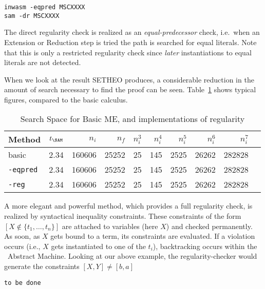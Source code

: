 \begin{center}
\begin{verbatim}
inwasm -eqpred MSCXXXX
sam -dr MSCXXXX
\end{verbatim}
\end{center}

The direct regularity check is realized as an {\em
equal-predecessor\/} check, i.e.\ when an Extension or Reduction step
is tried the path is searched for equal literals. Note that this is
only a restricted regularity check since {\em later\/} instantiations
to equal literals are not detected. 

When we look at the result SETHEO produces, a considerable 
reduction in the amount of search necessary to find the proof
can be seen.
Table~\ref{tab:tut2:results.regularity} shows typical figures, compared
to the basic calculus.

\begin{table}[htb]
\begin{center}
\begin{tabular}{|l|r|r||r|r||r|r|r|r|r|}
\hline
Method & $t_{\SAM}$ & $n_i$ & $n_f$ & 
	$n_i^3$ & $n_i^4$ & $n_i^5$ & $n_i^6$ & $n_i^7$ \\
\hline\hline
basic & 2.34 & 160606 & 25252 &
	25 & 145 & 2525 & 26262 & 282828 \\
\hline
{\tt -eqpred} & 2.34 & 160606 & 25252 &
	25 & 145 & 2525 & 26262 & 282828 \\
\hline
{\tt -reg} & 2.34 & 160606 & 25252 &
	25 & 145 & 2525 & 26262 & 282828 \\
\hline\hline
\end{tabular}
\end{center}
\caption{Search Space for Basic ME, and implementations of
regularity}
\label{tab:tut2:results.regularity}
\end{table}


A more elegant and powerful method, which provides a full
regularity check, is realized by syntactical
inequality constraints. These constraints of the form
$ [ X \not\in \{t_1,\ldots,t_n\}] $  are attached to variables (here $X$)
and checked permanently. As soon, as $X$ gets bound to a term,
its constraints are evaluated. If a violation occurs (i.e.,
$X$ gets instantiated to one of the $t_i$), backtracking
occurs within the \SAM\ Abstract Machine.
Looking at our above example, the regularity-checker would
generate the constraints $[ X,Y ] \not = [ b,a ]$

{\tt to be done}

